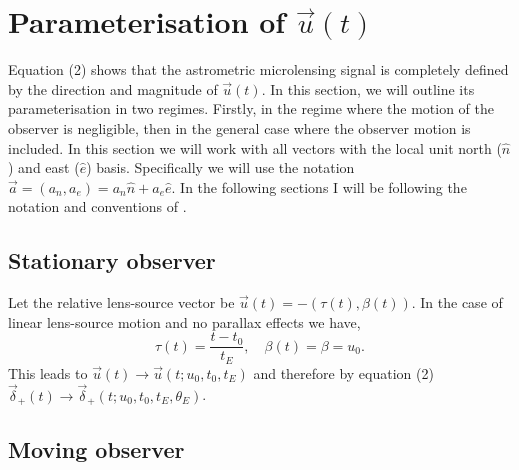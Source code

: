 \documentclass[11pt]{article}
\begin{document}
\section{Parameterisation of $\vec{u}(t)$}
%
Equation (2) shows that the astrometric microlensing signal is completely
defined by the direction and magnitude of $\vec{u}(t)$. In this section, we will outline
its parameterisation in two regimes. Firstly, in the regime where the motion of the observer
is negligible, then in the general case where the observer motion is included. 
In this section we will work with all vectors with the local unit north ($\hat{n}$) 
and east ($\hat{e}$) basis. Specifically we will use the notation 
$\vec{a} = (a_{n},a_{e}) = a_{n}\hat{n} + a_{e}\hat{e}$. In the following sections
I will be following the notation and conventions of \cite{Gould04}.

\subsection{Stationary observer}

Let the relative lens-source vector be $\vec{u}(t) = -(\tau(t),\beta(t))$. In the case
of linear lens-source motion and no parallax effects we have,
%
\begin{equation}
\tau(t) = \frac{t-t_{0}}{t_{E}}, \quad \beta(t) = \beta
        = u_{0}.
\end{equation}
%
This leads to $\vec{u}(t) \to \vec{u}(t;u_{0},t_{0},t_{E})$ and therefore
by equation (2) $\vec{\delta}_{+}(t) \to \vec{\delta}_{+}(t;u_{0},t_{0},t_{E},\theta_{E})$.

\subsection{Moving observer}
\end{document}
